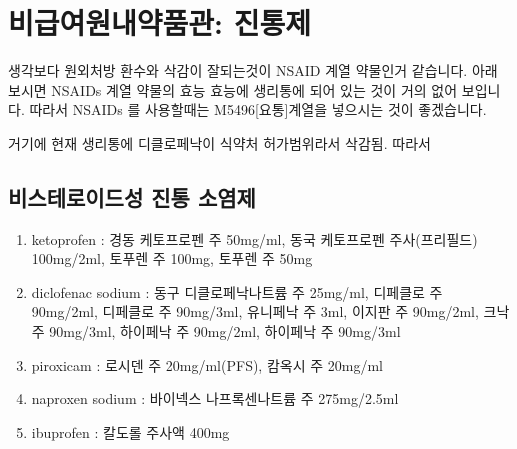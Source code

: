 \section{비급여원내약품관: 진통제} \label{analgesia}
생각보다 원외처방 환수와 삭감이 잘되는것이 NSAID 계열 약물인거 같습니다.
아래 보시면 NSAIDs 계열 약물의 효능 효능에 생리통에 되어 있는 것이 거의 없어 보입니다.
따라서 NSAIDs 를 사용할때는 M5496[요통]계열을 넣으시는 것이 좋겠습니다.\par
거기에 현재 생리통에 디클로페낙이 식약처 허가범위라서 삭감됨. 따라서 

\subsection{비스테로이드성 진통 소염제}
\begin{enumerate}\tightlist
\item ketoprofen : 경동 케토프로펜 주 50mg/ml, 동국 케토프로펜 주사(프리필드) 100mg/2ml, 토푸렌 주 100mg, 토푸렌 주 50mg
\item diclofenac sodium : 동구 디클로페낙나트륨 주 25mg/ml, 디페클로 주 90mg/2ml, 디페클로 주 90mg/3ml, 유니페낙 주 3ml, 이지판 주 90mg/2ml, 크낙주 90mg/3ml, 하이페낙 주 90mg/2ml, 하이페낙 주 90mg/3ml
\item piroxicam : 로시덴 주 20mg/ml(PFS), 캄옥시 주 20mg/ml
\item naproxen sodium : 바이넥스 나프록센나트륨 주 275mg/2.5ml
\item ibuprofen : 칼도롤 주사액 400mg
\end{enumerate}
